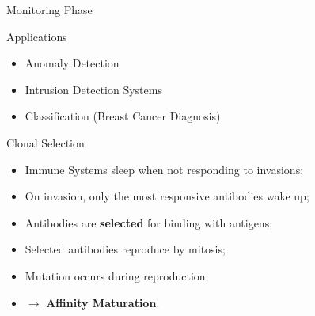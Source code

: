 \documentclass[xcolor=svgnames]{beamer}
\begin{document}
        \begin{frame}{Monitoring Phase}
            \SetEndCharOfAlgoLine{}
                \centering
        \end{frame}
        
    \begin{frame}{Applications}
        \begin{itemize}
            \item Anomaly Detection
            \item Intrusion Detection Systems
            \item Classification (Breast Cancer Diagnosis)
        \end{itemize}
    \end{frame}
        
    \begin{frame}{Clonal Selection}
        \begin{itemize}
            \item Immune Systems sleep when not responding to invasions;
            \item On invasion, only the most responsive antibodies wake up;
            \item Antibodies are \textbf{selected} for binding with antigens;
            \item Selected antibodies reproduce by mitosis;
            \item Mutation occurs during reproduction;
            \item $\rightarrow$ \textbf{Affinity Maturation}.
        \end{itemize}
    \end{frame}
    
\end{document}
